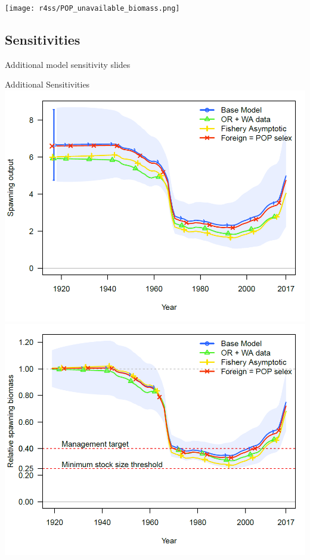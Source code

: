 \documentclass[pdf]{beamer}\usepackage[]{graphicx}\usepackage[]{color}
\begin{document}
\begin{frame}
  \begin{center}
    \texttt{[image: r4ss/POP\_unavailable\_biomass.png]}
  \end{center}
\end{frame}

\subsection*{Sensitivities}
\begin{frame}
  \Huge{\centerline{Additional model sensitivity slides}}
\end{frame}

\begin{frame}{Additional Sensitivities}
  \includegraphics[scale = 0.24]{figures/ssb_sens3.png}
  \includegraphics[scale = 0.24]{figures/depl_sens3.png}
\end{frame}
\end{document}
